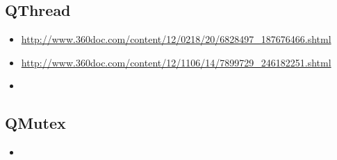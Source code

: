 \documentclass[9pt,b5paper]{article}
\begin{document}
\subsection{QThread}
\label{sec-15-22}
\begin{itemize}
\item \url{http://www.360doc.com/content/12/0218/20/6828497_187676466.shtml}
\item \url{http://www.360doc.com/content/12/1106/14/7899729_246182251.shtml}
\item 
\end{itemize}
\subsection{QMutex}
\label{sec-15-23}
\begin{itemize}
\item 
\end{itemize}
\end{document}
